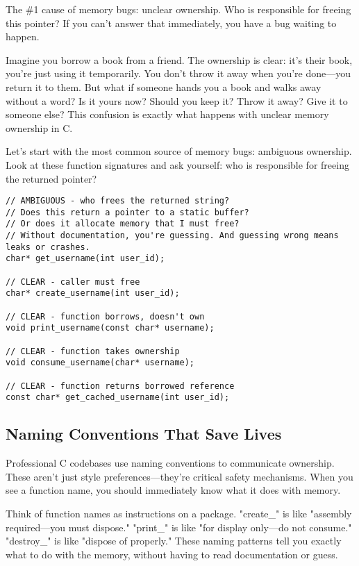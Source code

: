 The \#1 cause of memory bugs: unclear ownership. Who is responsible for freeing this pointer? If you can't answer that immediately, you have a bug waiting to happen.

Imagine you borrow a book from a friend. The ownership is clear: it's their book, you're just using it temporarily. You don't throw it away when you're done—you return it to them. But what if someone hands you a book and walks away without a word? Is it yours now? Should you keep it? Throw it away? Give it to someone else? This confusion is exactly what happens with unclear memory ownership in C.

Let's start with the most common source of memory bugs: ambiguous ownership. Look at these function signatures and ask yourself: who is responsible for freeing the returned pointer?

\begin{lstlisting}
// AMBIGUOUS - who frees the returned string?
// Does this return a pointer to a static buffer?
// Or does it allocate memory that I must free?
// Without documentation, you're guessing. And guessing wrong means leaks or crashes.
char* get_username(int user_id);

// CLEAR - caller must free
char* create_username(int user_id);

// CLEAR - function borrows, doesn't own
void print_username(const char* username);

// CLEAR - function takes ownership
void consume_username(char* username);

// CLEAR - function returns borrowed reference
const char* get_cached_username(int user_id);
\end{lstlisting}

\subsection{Naming Conventions That Save Lives}

Professional C codebases use naming conventions to communicate ownership. These aren't just style preferences—they're critical safety mechanisms. When you see a function name, you should immediately know what it does with memory.

Think of function names as instructions on a package. "create\_" is like "assembly required—you must dispose." "print\_" is like "for display only—do not consume." "destroy\_" is like "dispose of properly." These naming patterns tell you exactly what to do with the memory, without having to read documentation or guess.

